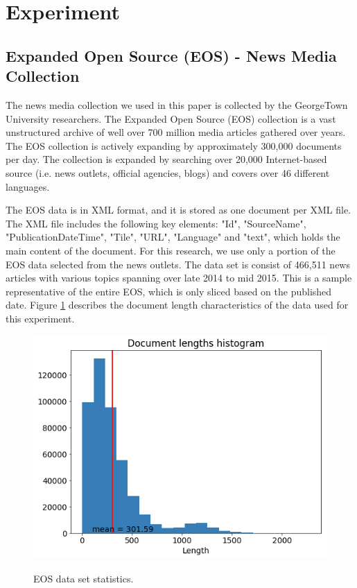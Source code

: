 \section{Experiment}

\subsection{Expanded Open Source (EOS) - News Media Collection}
The news media collection we used in this paper is collected by the GeorgeTown University researchers. The Expanded Open Source (EOS) collection is a vast unstructured archive of well over 700 million media articles gathered over years. The EOS collection is actively expanding by approximately 300,000 documents per day. The collection is expanded by searching over 20,000 Internet-based source (i.e. news outlets, official agencies, blogs) and covers over 46 different languages.

The EOS data is in XML format, and it is stored as one document per XML file. The XML file includes the following key elements: "Id", "SourceName", "PublicationDateTime", "Tile", "URL", "Language" and "text", which holds the main content of the document. For this research, we use only a portion of the EOS data selected from the news outlets. The data set is consist of 466,511 news articles with various topics spanning over late 2014 to mid 2015. This is a sample representative of the entire EOS, which is only sliced based on the published date. Figure \ref{fig:corpus_histogram} describes the document length characteristics of the data used for this experiment.

\begin{figure}[t]
\caption{EOS data set statistics.}
\includegraphics[scale=.6]{img/corpus_histogram.png}
\centering
\label{fig:corpus_histogram}
\end{figure}

